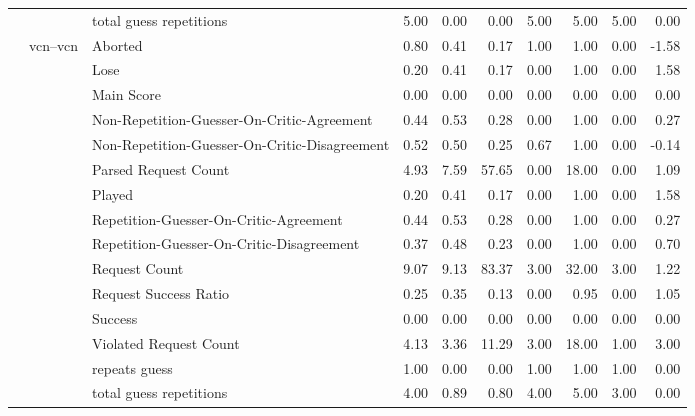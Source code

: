 \begin{tabular}{lllrrrrrrr}
 &  & total guess repetitions & 5.00 & 0.00 & 0.00 & 5.00 & 5.00 & 5.00 & 0.00 \\
\cline{2-10}
 & \multirow[t]{15}{*}{vcn--vcn} & Aborted & 0.80 & 0.41 & 0.17 & 1.00 & 1.00 & 0.00 & -1.58 \\
 &  & Lose & 0.20 & 0.41 & 0.17 & 0.00 & 1.00 & 0.00 & 1.58 \\
 &  & Main Score & 0.00 & 0.00 & 0.00 & 0.00 & 0.00 & 0.00 & 0.00 \\
 &  & Non-Repetition-Guesser-On-Critic-Agreement & 0.44 & 0.53 & 0.28 & 0.00 & 1.00 & 0.00 & 0.27 \\
 &  & Non-Repetition-Guesser-On-Critic-Disagreement & 0.52 & 0.50 & 0.25 & 0.67 & 1.00 & 0.00 & -0.14 \\
 &  & Parsed Request Count & 4.93 & 7.59 & 57.65 & 0.00 & 18.00 & 0.00 & 1.09 \\
 &  & Played & 0.20 & 0.41 & 0.17 & 0.00 & 1.00 & 0.00 & 1.58 \\
 &  & Repetition-Guesser-On-Critic-Agreement & 0.44 & 0.53 & 0.28 & 0.00 & 1.00 & 0.00 & 0.27 \\
 &  & Repetition-Guesser-On-Critic-Disagreement & 0.37 & 0.48 & 0.23 & 0.00 & 1.00 & 0.00 & 0.70 \\
 &  & Request Count & 9.07 & 9.13 & 83.37 & 3.00 & 32.00 & 3.00 & 1.22 \\
 &  & Request Success Ratio & 0.25 & 0.35 & 0.13 & 0.00 & 0.95 & 0.00 & 1.05 \\
 &  & Success & 0.00 & 0.00 & 0.00 & 0.00 & 0.00 & 0.00 & 0.00 \\
 &  & Violated Request Count & 4.13 & 3.36 & 11.29 & 3.00 & 18.00 & 1.00 & 3.00 \\
 &  & repeats guess & 1.00 & 0.00 & 0.00 & 1.00 & 1.00 & 1.00 & 0.00 \\
 &  & total guess repetitions & 4.00 & 0.89 & 0.80 & 4.00 & 5.00 & 3.00 & 0.00 \\
\cline{1-10} \cline{2-10}
\bottomrule
\end{tabular}
